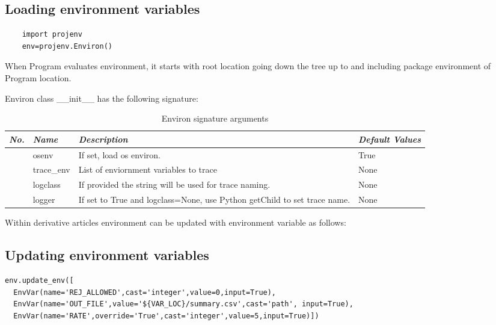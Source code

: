 \documentclass[design.tex]{subfiles}
\begin{document}
\subsection{Loading environment variables}

	\begin{lstlisting}
	import projenv 
	env=projenv.Environ()
	\end{lstlisting}

When Program evaluates environment, it starts with root location going down the tree up to and including package environment of Program location. 

Environ class \_\_init\_\_ has the following signature:

\begin{table}[!htb]
\setcounter{tablerownumbers}{0}
\begin{tabularx}{\linewidth}{|r|X|X|l|}
	\hline
	\emph{No.} & \emph{Name} & \emph{Description} & \emph{Default Values} \\ \hline
	\rownumber & osenv & If set, load os environ. & True \\ \hline
	\rownumber & trace\_env & List of enviornment variables to trace & None \\ \hline
	\rownumber & logclass & If provided the string will be used for trace naming. & None \\ \hline
	\rownumber & logger & If set to True and logclass=None, use Python getChild to set trace name. & None \\ \hline
	
\end{tabularx}
\caption{Environ signature arguments}
\label{table:environ-args}
\end{table}

Within derivative articles environment can be updated with environment variable as follows:

\subsection{Updating environment variables}  
\begin{lstlisting}
env.update_env([
  EnvVar(name='REJ_ALLOWED',cast='integer',value=0,input=True),
  EnvVar(name='OUT_FILE',value='${VAR_LOC}/summary.csv',cast='path', input=True),
  EnvVar(name='RATE',override='True',cast='integer',value=5,input=True)])
\end{lstlisting}
\end{document}
